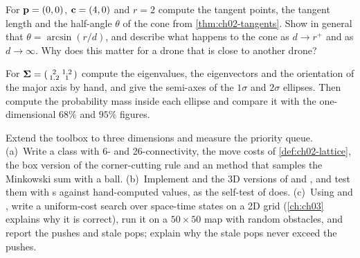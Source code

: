 \begin{exercise}[\difficulty{2}]
\label{exr:ch02-tangents}
For $\mathbf{p}=(0,0)$, $\mathbf{c}=(4,0)$ and $r=2$ compute the tangent points, the tangent length and the half-angle $\theta$ of the cone from \cref{thm:ch02-tangents}. Show in general that $\theta=\arcsin(r/d)$, and describe what happens to the cone as $d\to r^{+}$ and as $d\to\infty$. Why does this matter for a drone that is close to another drone?
\end{exercise}

\begin{exercise}[\difficulty{2}]
\label{exr:ch02-ellipse}
For $\mathbf{\Sigma}=\begin{psmallmatrix}2&1.2\\1.2&1\end{psmallmatrix}$ compute the eigenvalues, the eigenvectors and the orientation of the major axis by hand, and give the semi-axes of the $1\sigma$ and $2\sigma$ ellipses. Then compute the probability mass inside each ellipse and compare it with the one-dimensional $68\%$ and $95\%$ figures.
\end{exercise}

\begin{exercise}
\label{exr:ch02-coding}
Extend the toolbox to three dimensions and measure the priority queue. (a)~Write a class  with 6- and 26-connectivity, the move costs of \cref{def:ch02-lattice}, the box version of the corner-cutting rule and an  method that samples the Minkowski sum with a ball. (b)~Implement  and the 3D versions of  and , and test them with s against hand-computed values, as the self-test of  does. (c)~Using  and , write a uniform-cost search over space-time states on a 2D grid (\cref{ch:ch03} explains why it is correct), run it on a $50\times50$ map with random obstacles, and report the pushes and stale pops; explain why the stale pops never exceed the pushes.
\end{exercise}
